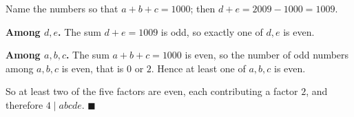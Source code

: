Name the numbers so that $a+b+c=1000$; then $d+e=2009-1000=1009$.

\textbf{Among $d,e$.} The sum $d+e=1009$ is odd, so exactly one of $d,e$ is even.

\textbf{Among $a,b,c$.} The sum $a+b+c=1000$ is even, so the number of odd numbers among $a,b,c$ is even, that is $0$ or $2$. Hence at least one of $a,b,c$ is even.

So at least two of the five factors are even, each contributing a factor $2$, and therefore $4\mid abcde$. $\blacksquare$
